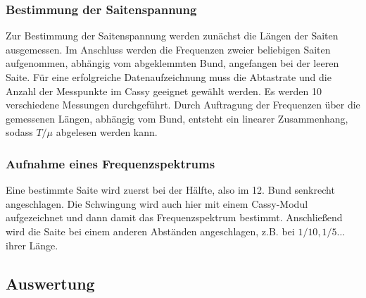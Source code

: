 \documentclass[a4paper, 11pt]{article}
\begin{document}
\subsubsection{Bestimmung der Saitenspannung}
Zur Bestimmung der Saitenspannung werden zunächst die Längen der Saiten ausgemessen. Im Anschluss werden die Frequenzen zweier beliebigen Saiten aufgenommen, abhängig vom abgeklemmten Bund, angefangen bei der leeren Saite. Für eine erfolgreiche Datenaufzeichnung muss die Abtastrate und die Anzahl der Messpunkte im Cassy geeignet gewählt werden. Es werden 10 verschiedene Messungen durchgeführt.  
Durch Auftragung der Frequenzen über die gemessenen Längen, abhängig vom Bund, entsteht ein linearer Zusammenhang, sodass $T/\mu$ abgelesen werden kann.  

\subsubsection{Aufnahme eines Frequenzspektrums} 
Eine bestimmte Saite wird zuerst bei der Hälfte, also im 12. Bund senkrecht angeschlagen. Die Schwingung wird auch hier mit einem Cassy-Modul aufgezeichnet und dann damit das Frequenzspektrum bestimmt. Anschließend wird die Saite bei einem anderen Abständen angeschlagen, z.B. bei $1/10, 1/5 \dots$ ihrer Länge.

\subsection{Auswertung}
\end{document}
